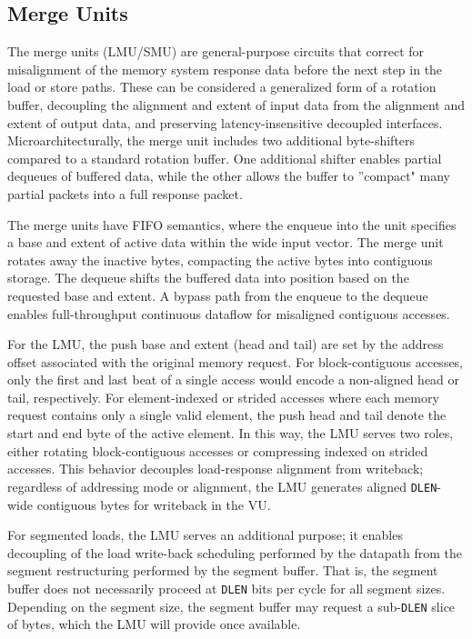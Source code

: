 \newpage
\subsection{Merge Units}



The merge units (LMU/SMU) are general-purpose circuits that correct for misalignment of the memory system response data before the next step in the load or store paths.
These can be considered a generalized form of a rotation buffer, decoupling the alignment and extent of input data from the alignment and extent of output data, and preserving latency-insensitive decoupled interfaces.
Microarchitecturally, the merge unit includes two additional byte-shifters compared to a standard rotation buffer.
One additional shifter enables partial dequeues of buffered data, while the other allows the buffer to ''compact" many partial packets into a full response packet.

The merge units have FIFO semantics, where the enqueue into the unit specifies a base and extent of active data within the wide input vector.
The merge unit rotates away the inactive bytes, compacting the active bytes into contiguous storage.
The dequeue shifts the buffered data into position based on the requested base and extent.
A bypass path from the enqueue to the dequeue enables full-throughput continuous dataflow for misaligned contiguous accesses.

For the LMU, the push base and extent (head and tail) are set by the address offset associated with the original memory request.
For block-contiguous accesses, only the first and last beat of a single access would encode a non-aligned head or tail, respectively.
For element-indexed or strided accesses where each memory request contains only a single valid element, the push head and tail denote the start and end byte of the active element.
In this way, the LMU serves two roles, either rotating block-contiguous accesses or compressing indexed on strided accesses.
This behavior decouples load-response alignment from writeback; regardless of addressing mode or alignment, the LMU generates aligned \texttt{DLEN}-wide contiguous bytes for writeback in the VU.

For segmented loads, the LMU serves an additional purpose; it enables decoupling of the load write-back scheduling performed by the datapath from the segment restructuring performed by the segment buffer.
That is, the segment buffer does not necessarily proceed at \texttt{DLEN} bits per cycle for all segment sizes.
Depending on the segment size, the segment buffer may request a sub-\texttt{DLEN} slice of bytes, which the LMU will provide once available.

